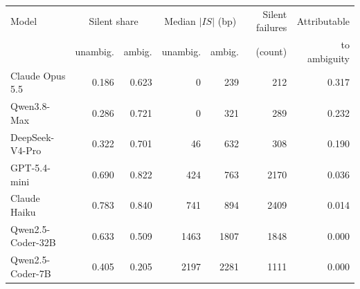 \begin{tabular}{lrrrrrr}
\toprule
Model & \multicolumn{2}{c}{Silent share} & \multicolumn{2}{c}{Median $|IS|$ (bp)} & Silent failures & Attributable \\
 & unambig. & ambig. & unambig. & ambig. & (count) & to ambiguity \\
\midrule
Claude Opus 5.5 & 0.186 & 0.623 & 0 & 239 & 212 & 0.317 \\
Qwen3.8-Max & 0.286 & 0.721 & 0 & 321 & 289 & 0.232 \\
DeepSeek-V4-Pro & 0.322 & 0.701 & 46 & 632 & 308 & 0.190 \\
GPT-5.4-mini & 0.690 & 0.822 & 424 & 763 & 2170 & 0.036 \\
Claude Haiku & 0.783 & 0.840 & 741 & 894 & 2409 & 0.014 \\
Qwen2.5-Coder-32B & 0.633 & 0.509 & 1463 & 1807 & 1848 & 0.000 \\
Qwen2.5-Coder-7B & 0.405 & 0.205 & 2197 & 2281 & 1111 & 0.000 \\
\bottomrule
\end{tabular}
